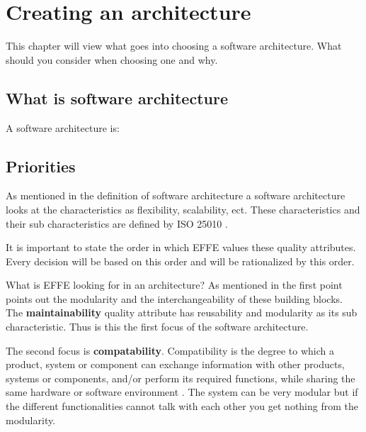 \chapter{Creating an architecture}

This chapter will view what goes into choosing a software architecture. What should you consider when choosing one and why.

\section{What is software architecture}
\label{sec:WhatIsSoftwareArchitecture}

A software architecture is:


\section{Priorities}

As mentioned in the definition of software architecture  a software architecture looks at the characteristics as flexibility, scalability, ect. These characteristics and their sub characteristics are defined by ISO 25010 \cite{iso25010}.

It is important to state the order in which EFFE values these quality attributes. Every decision will be based on this order and will be rationalized by this order.

What is EFFE looking for in an architecture? As mentioned in  the first point points out the modularity and the interchangeability of these building blocks. The \textbf{maintainability} quality attribute has reusability and modularity as its sub characteristic. Thus is this the first focus of the software architecture.

The second focus is \textbf{compatability}. Compatibility is the degree to which a product, system or component can exchange information with other products, systems or components, and/or perform its required functions, while sharing the same hardware or software environment \cite{iso25010}. The system can be very modular but if the different functionalities cannot talk with each other you get nothing from the modularity.

